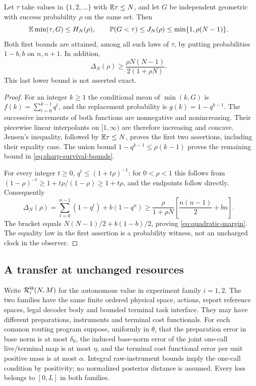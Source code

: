 \begin{lemma}\label{lem:sharp-survival}
Let $\tau$ take values in $\{1,2,\ldots\}$ with $\mathbb E\tau\le N$, and let $G$ be independent geometric with success probability $\rho$ on the same set. Then
\begin{equation}\label{eq:sharp-survival-bounds}
 \mathbb E\min(\tau,G)\le H_N(\rho),\qquad
 \mathbb P(G<\tau)\le J_N(\rho)\le\min\{1,\rho(N-1)\}.
\end{equation}
Both first bounds are attained, among all such laws of $\tau$, by putting probabilities $1-b,b$ on $n,n+1$. In addition,
\begin{equation}\label{eq:quadratic-margin}
 \Delta_N(\rho)\ge
 \frac{\rho N(N-1)}{2(1+\rho N)}.
\end{equation}
This last lower bound is not asserted exact.
\end{lemma}
\begin{proof}
For an integer $k\ge1$ the conditional mean of $\min(k,G)$ is
$f(k)=\sum_{t=0}^{k-1}q^t$, and the replacement probability is
$g(k)=1-q^{k-1}$. The successive increments of both functions are nonnegative and nonincreasing. Their piecewise linear interpolants on $[1,\infty)$ are therefore increasing and concave. Jensen's inequality, followed by $\mathbb E\tau\le N$, proves the first two assertions, including their equality case. The union bound $1-q^{k-1}\le\rho(k-1)$ proves the remaining bound in \eqref{eq:sharp-survival-bounds}.

For every integer $t\ge0$,
$q^t\le(1+t\rho)^{-1}$: for $0<\rho<1$ this follows from
$(1-\rho)^{-t}\ge1+t\rho/(1-\rho)\ge1+t\rho$, and the endpoints follow directly. Consequently
\[
 \Delta_N(\rho)=\sum_{t=0}^{n-1}(1-q^t)+b(1-q^n)
 \ge \frac{\rho}{1+\rho N}
       \left[\frac{n(n-1)}2+bn\right].
\]
The bracket equals $N(N-1)/2+b(1-b)/2$, proving
\eqref{eq:quadratic-margin}. The equality law in the first assertion is a probability witness, not an uncharged clock in the observer.
\end{proof}

\subsection{A transfer at unchanged resources}
Write $\mathcal R_i^\Theta(N,M)$ for the autonomous value in experiment family $i=1,2$. The two families have the same finite ordered physical space, actions, report reference spaces, legal decoder body and bounded terminal task interface. They may have different preparations, instruments and terminal cost functionals. For each common routing program suppose, uniformly in $\theta$, that the preparation error in base norm is at most $\delta_0$, the induced base-norm error of the joint one-call live/terminal map is at most $\eta$, and the terminal cost functional error per unit positive mass is at most $\alpha$. Integral raw-instrument bounds imply the one-call condition by positivity; no normalized posterior distance is assumed. Every loss belongs to $[0,L]$ in both families.

